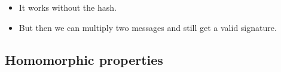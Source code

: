 %

\begin{frame}
  \begin{remark}
    \begin{itemize}
      \item It works without the hash.
      \item But then we can multiply two messages and still get a valid 
        signature.
    \end{itemize}
  \end{remark}
\end{frame}

\subsection{Homomorphic properties}

